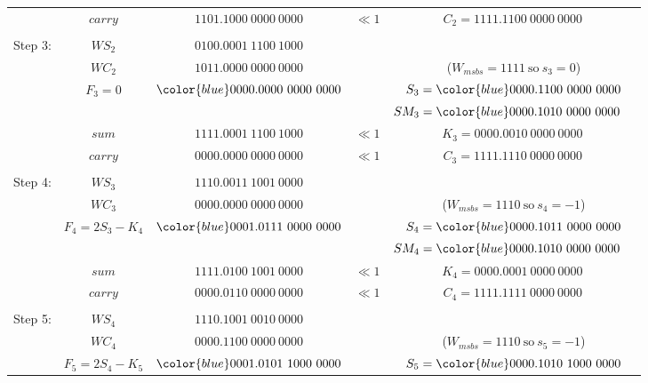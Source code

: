 \documentclass[12pt]{article}
\begin{document}
{\begin{center}
\begin{tabular}{ccccc}
            &$carry         $&$         1101.1000\ 0000\ 0000   $&$\ll1    $&$C_2=1111.1100\ 0000\ 0000\,$\\
    \hdashline\\
    Step 3: &$WS_2          $&$         0100.0001\ 1100\ 1000   $&          &\\
            &$WC_2          $&$         1011.0000\ 0000\ 0000   $&          &($W_{msbs}=1111\ \text{so}\ s_3=0$)\\
            &$F_3=0       $&${\color{blue}0000.000}0\ 0000\ 0000$&          &$S_3={\color{blue}0000.110}0\ 0000\ 0000$\\
            &                &                                   &          &$SM_3={\color{blue}0000.101}0\ 0000\ 0000\phantom{M}$\\
    \cline{2-3}
            &$sum           $&$         1111.0001\ 1100\ 1000   $&$\ll1    $&$K_3=0000.0010\ 0000\ 0000\ $\\
            &$carry         $&$         0000.0000\ 0000\ 0000   $&$\ll1    $&$C_3=1111.1110\ 0000\ 0000\,$\\
    \hdashline\\
    Step 4: &$WS_3          $&$         1110.0011\ 1001\ 0000   $&          &\\
            &$WC_3          $&$         0000.0000\ 0000\ 0000   $&          &($W_{msbs}=1110\ \text{so}\ s_4=-1$)\\
            &$F_4=2S_3-K_4 $&${\color{blue}0001.0111}\ 0000\ 0000$&          &$S_4={\color{blue}0000.1011}\ 0000\ 0000$\\
            &                &                                   &          &$SM_4={\color{blue}0000.1010}\ 0000\ 0000\phantom{M}$\\
    \cline{2-3}
            &$sum           $&$         1111.0100\ 1001\ 0000   $&$\ll1    $&$K_4=0000.0001\ 0000\ 0000\ $\\
            &$carry         $&$         0000.0110\ 0000\ 0000   $&$\ll1    $&$C_4=1111.1111\ 0000\ 0000\,$\\
    \hdashline\\
    Step 5: &$WS_4          $&$         1110.1001\ 0010\ 0000   $&          &\\
            &$WC_4          $&$         0000.1100\ 0000\ 0000   $&          &($W_{msbs}=1110\ \text{so}\ s_5=-1$)\\
            &$F_5=2S_4-K_5 $&${\color{blue}0001.0101\ 1}000\ 0000$&          &$S_5={\color{blue}0000.1010\ 1}000\ 0000$\\

\end{tabular}
\end{center}}
\end{document}
